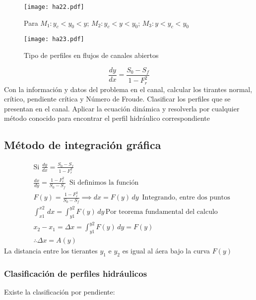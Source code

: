 \begin{figure}[h!]
\centering
  \texttt{[image: ha22.pdf]}
  \caption{Para $M_1: y_c<y_0<y$; $M_2: y_c<y<y_0$;  $M_3: y<y_c<y_0$}
  \label{ha22}
\end{figure}

\begin{figure}[h!]
\centering
  \texttt{[image: ha23.pdf]}
  \caption{Tipo de perfiles en flujos de canales abiertos}
  \label{ha23}
\end{figure}

\begin{equation}
    \frac{dy}{dx} = \frac{S_0 -S_f}{1 -F^2_r}
\end{equation}
Con la información y datos del problema en el canal, calcular los tirantes normal, crítico, pendiente crítica y Número de Froude. Clasificar los perfiles que se presentan en el canal. Aplicar la ecuación dinámica y resolverla por cualquier método conocido para encontrar el perfil hidráulico correspondiente

\subsection{Método de integración gráfica}

\begin{align*}
    &\text{Si } \frac{dy}{dx}= \frac{S_0 -S_f}{1 -F^2_r}\\
    &\frac{dx}{dy}= \frac{1 -F^2_r}{S_0 -S_f}\, \text{ Si definimos la función}\\
    &F(y) = \frac{1 -F^2_r}{S_0 -S_f}\implies dx = F(y)\,dy\,\text{ Integrando, entre dos puntos}\\
    &\int_{x1}^{x2}\,dx = \int_{y1}^{y2} F(y)\,dy\,\text{Por teorema fundamental del calculo}\\
    &x_2 -x_1 = \Delta x =\int_{y1}^{y2} F(y)\,dy = F(y)\\
    &\therefore \Delta x= A(y)
\end{align*}
La distancia entre los tierantes $y_1$ e $y_2$ es igual al áera bajo la curva $F(y)$

\subsubsection{Clasificación de perfiles hidráulicos}

Existe la clasificación por pendiente:


